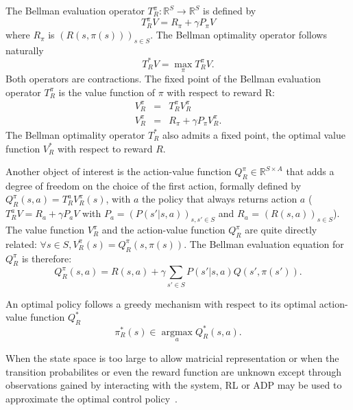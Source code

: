 \documentclass[smallextended]{svjour3}
\newcommand{\argmax}{\operatorname*{argmax}} %
\begin{document}
The Bellman evaluation operator $T^\pi_R: \mathbb{R}^{S} \rightarrow  \mathbb{R}^{S}$ is defined by
\begin{equation}
  T^{\pi}_RV = R_\pi + \gamma P_\pi V
  \end{equation}
where $R_\pi$ is $(R(s,\pi(s)))_{s\in S}$. The Bellman optimality operator follows naturally
\begin{equation}
  T^*_RV = \max_\pi T^\pi_RV.
\end{equation}
  Both operators are contractions. The fixed point of the Bellman evaluation operator $T^\pi_R$ is the value function of $\pi$ with respect to reward R:
  \begin{eqnarray}
    V^\pi_R &=& T^\pi_R V^\pi_R\\
    V^\pi_R &=& R_\pi + \gamma P_\pi V^\pi_R.
  \end{eqnarray}
The Bellman optimality operator $T^*_R$ also admits a fixed point, the optimal value function $V_R^*$ with respect to reward $R$.

Another object of interest is the action-value function $Q^\pi_R\in\mathbb{R}^{S\times A}$ that adds a degree of freedom on the choice of the first action, formally defined by $Q^\pi_R(s,a) = T^a_RV^\pi_R(s)$, with $a$ the policy that always returns action $a$ ($T^a_RV = R_a + \gamma P_a V$ with $P_a = (P(s'|s,a))_{s,s' \in S}$ and $R_a$ = $(R(s,a))_{s\in S}$). The value function $V^\pi_R$ and the action-value function $Q^\pi_R$ are quite directly related: $\forall s \in S, V^\pi_R(s) = Q^\pi_R(s,\pi(s))$. The Bellman evaluation equation for $Q^\pi_R$ is therefore:
\begin{equation}
  Q^\pi_R(s,a) = R(s,a) + \gamma \sum_{s'\in S}P(s'|s,a) Q(s',\pi(s')).
  \label{eq:bellman1}
\end{equation}

An optimal policy follows a greedy mechanism with respect to its optimal action-value function $Q^*_R$
\begin{equation}
  \label{eq:greedy}
  \pi^*_R(s)\in\argmax_aQ^*_R(s,a).
\end{equation}

When the state space is too large to allow matricial representation or when the transition probabilites or even the reward function are unknown except through observations gained by interacting with the system, RL or ADP may be used to approximate the optimal control policy~\cite{sutton1998reinforcement}.
\end{document}
